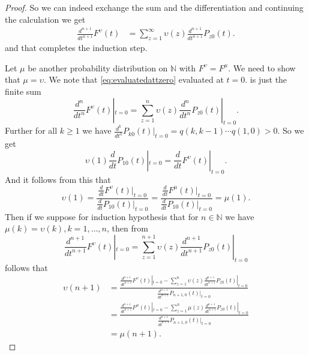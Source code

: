 \documentclass[12pt,a4paper]{scrartcl}
\numberwithin{equation}{section}
\newcommand{\N}{\mathbb{N}} %
\begin{document}
\begin{proof}
So we can indeed exchange the sum and the differentiation and continuing the calculation we get
\begin{align*}
\frac{d^{n+1}}{dt^{n+1}} F^{\upsilon}\left(t\right) &= \sum_{z=1}^{\infty} \upsilon\left(z\right) \frac{d^{n+1}}{dt^{n+1}} P_{z0}\left(t\right). 
\end{align*}
and that completes the induction step.


Let $\mu$ be another probability distribution on $\N$ with $F^{\upsilon} = F^{\mu}$. We need to show that $\mu = \upsilon.$ We note that \eqref{eq:evaluatedattzero} evaluated at $t=0.$ is just the finite sum
\begin{equation}
\frac{d^n}{dt^n}F^{\upsilon}\left(t\right)|_{t=0} = \sum_{z=1}^{n} \upsilon\left(z\right) \frac{d^n}{dt^n} P_{z0}\left(t\right)|_{t=0}.
\end{equation}
Further for all $k \geq 1$ we have $\frac{d^k}{dt^k}P_{k0}\left(t\right)|_{t=0} = q\left(k,k-1\right) \cdots q\left(1,0\right) > 0.$ So we get
$$\upsilon\left(1\right) \frac{d}{dt}P_{10}\left(t\right)|_{t=0} = \frac{d}{dt}F^{\upsilon}\left(t\right)|_{t=0}. $$
And it follows from this that
$$\upsilon\left(1\right) = \frac{\frac{d}{dt}F^{\upsilon}\left(t\right)|_{t=0}}{\frac{d}{dt}P_{10}\left(t\right)|_{t=0}} = \frac{\frac{d}{dt}F^{\mu}\left(t\right)|_{t=0}}{\frac{d}{dt}P_{10}\left(t\right)|_{t=0}} = \mu\left(1\right). $$
Then if we suppose for induction hypothesis that for $n \in \N$ we have $\mu\left(k\right) = \upsilon\left(k\right), k=1,\ldots, n$, then from
$$\frac{d^{n+1}}{dt^{n+1}}F^{\upsilon}\left(t\right)|_{t=0} = \sum_{z=1}^{n+1} \upsilon\left(z\right) \frac{d^{n+1}}{dt^{n+1}} P_{z0}\left(t\right)|_{t=0} $$
follows that
\begin{align*}
\upsilon\left(n+1\right) &= \frac{\frac{d^{n+1}}{dt^{n+1}}F^{\upsilon}\left(t\right)|_{t=0} - \sum_{z=1}^{n} \upsilon\left(z\right) \frac{d^{n+1}}{dt^{n+1}} P_{z0}\left(t\right)|_{t=0} }{\frac{d^{n+1}}{dt^{n+1}}P_{n+1,0}\left(t\right)|_{t=0} } \\
&= \frac{\frac{d^{n+1}}{dt^{n+1}}F^{\mu}\left(t\right)|_{t=0} - \sum_{z=1}^{n} \mu\left(z\right) \frac{d^{n+1}}{dt^{n+1}} P_{z0}\left(t\right)|_{t=0} }{\frac{d^{n+1}}{dt^{n+1}}P_{n+1,0}\left(t\right)|_{t=0} } \\
&= \mu\left(n+1\right).
\end{align*}


\end{proof}
\end{document}
